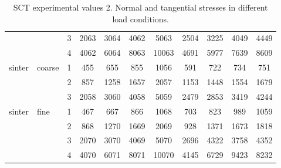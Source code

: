 \begin{table}
\begin{tabular}{ll|c|cccc|cccc}
          &       & 3     & 2063  & 3064  & 4062  & 5063  & 2504  & 3225  & 4049  & 4449 \\
          &       & 4     & 4062  & 6064  & 8063  & 10063 & 4691  & 5977  & 7639  & 8609 \\
\hline
    sinter & coarse & 1     & 455   & 655   & 855   & 1056  & 591   & 722   & 734   & 751 \\
          &       & 2     & 857   & 1258  & 1657  & 2057  & 1153  & 1448  & 1554  & 1679 \\
          &       & 3     & 2058  & 3060  & 4058  & 5059  & 2479  & 2853  & 3419  & 4244 \\
\hline
    sinter & fine  & 1     & 467   & 667   & 866   & 1068  & 703   & 823   & 989   & 1059 \\
          &       & 2     & 868   & 1270  & 1669  & 2069  & 928   & 1371  & 1673  & 1818 \\
          &       & 3     & 2070  & 3070  & 4069  & 5070  & 2696  & 4322  & 3758  & 4352 \\
          &       & 4     & 4070  & 6071  & 8071  & 10070 & 4145  & 6729  & 9423  & 8232 \\
       \hline
\end{tabular}
\caption[SCT experimental values 2]{\acs{SCT} experimental values 2. Normal and
tangential stresses in different load conditions.}
\label{tab:21shearcell2}
\end{table}